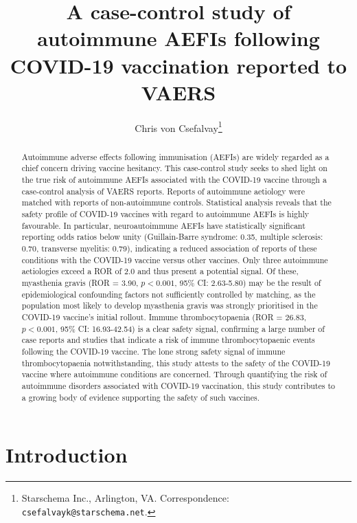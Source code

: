 \documentclass{article}
\title{A case-control study of autoimmune AEFIs following COVID-19 vaccination reported to VAERS}
\author{Chris von Csefalvay\thanks{Starschema Inc., Arlington, VA. Correspondence: \texttt{csefalvayk@starschema.net}.}}
\begin{document}
\maketitle

\begin{abstract}
Autoimmune adverse effects following immunisation (AEFIs) are widely regarded as a chief concern driving vaccine hesitancy.
This case-control study seeks to shed light on the true risk of autoimmune AEFIs associated with the COVID-19 vaccine through a case-control analysis of VAERS reports.
Reports of autoimmune aetiology were matched with reports of non-autoimmune controls.
Statistical analysis reveals that the safety profile of COVID-19 vaccines with regard to autoimmune AEFIs is highly favourable.
In particular, neuroautoimmune AEFIs have statistically significant reporting odds ratios below unity (Guillain-Barre syndrome: 0.35, multiple sclerosis: 0.70, transverse myelitis: 0.79), indicating a reduced association of reports of these conditions with the COVID-19 vaccine versus other vaccines.
Only three autoimmune aetiologies exceed a ROR of 2.0 and thus present a potential signal.
Of these, myasthenia gravis (ROR = 3.90, $p < 0.001$, 95\% CI: 2.63-5.80) may be the result of epidemiological confounding factors not sufficiently controlled by matching, as the population most likely to develop myasthenia gravis was strongly prioritised in the COVID-19 vaccine's initial rollout.
Immune thrombocytopaenia (ROR = 26.83, $p < 0.001$, 95\% CI: 16.93-42.54) is a clear safety signal, confirming a large number of case reports and studies that indicate a risk of immune thrombocytopaenic events following the COVID-19 vaccine.
The lone strong safety signal of immune thrombocytopaenia notwithstanding, this study attests to the safety of the COVID-19 vaccine where autoimmune conditions are concerned.
Through quantifying the risk of autoimmune disorders associated with COVID-19 vaccination, this study contributes to a growing body of evidence supporting the safety of such vaccines.

\end{abstract}

\section{Introduction}
\end{document}
